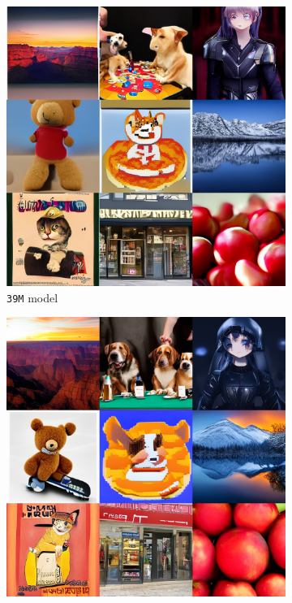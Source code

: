 \begin{figure}[htbp]
    \centering
    \begin{subfigure}[b]{0.32\textwidth}
    \centering
    \includegraphics[width=\textwidth]{cp2/figures/t2i/c64.jpg}
    \caption{\texttt{39M} model}
    \end{subfigure}
    \begin{subfigure}[b]{0.32\textwidth}
    \centering
    \includegraphics[width=\textwidth]{cp2/figures/t2i/c96.jpg}

\end{subfigure}
\end{figure}

